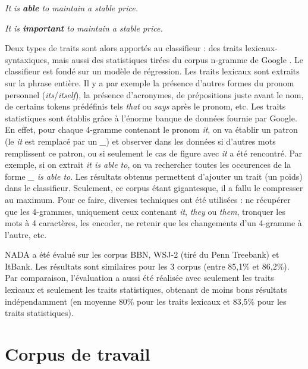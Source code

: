 \documentclass[a4paper,12pt]{article}
\begin{document}
\og{} \textit{It is \textbf{able} to maintain a stable price.} \fg{}

\og{} \textit{It is \textbf{important} to maintain a stable price.} \fg{}

Deux types de traits sont alors apportés au classifieur : des traits lexicaux-syntaxiques, mais aussi des statistiques tirées du corpus n-gramme de Google \citep{google-ngram}. Le classifieur est fondé sur un modèle de régression. Les traits lexicaux sont extraits sur la phrase entière. Il y a par exemple la présence d'autres formes du pronom personnel (\textit{its}/\textit{itself}), la présence d'acronymes, de prépositions juste avant le nom, de certains tokens prédéfinis tels \og{}\textit{that}\fg{} ou \og{}\textit{says}\fg{} après le pronom, etc.
Les traits statistiques sont établis grâce à l'énorme banque de données fournie par Google. En effet, pour chaque 4-gramme contenant le pronom \og{}\textit{it}\fg{}, on va établir un patron (le \og{}\textit{it}\fg{} est remplacé par un \og{}\textit{\_}\fg{}) et observer dans les données si d'autres mots remplissent ce patron, ou si seulement le cas de figure avec \og{}\textit{it}\fg{} a été rencontré. Par exemple, si on extrait \og{}\textit{it is able to}\fg{}, on va rechercher toutes les occurences de la forme \og{}\textit{\_ is able to}\fg{}.
Les résultats obtenus permettent d'ajouter un trait (un poids) dans le classifieur.
Seulement, ce corpus étant gigantesque, il a fallu le compresser au maximum. Pour ce faire, diverses techniques ont été utilisées : ne récupérer que les 4-grammes, uniquement ceux contenant \og{}\textit{it}\fg{}, \og{}\textit{they}\fg{} ou \og{}\textit{them}\fg{}, tronquer les mots à 4 caractères, les encoder, ne retenir que les changements d'un 4-gramme à l'autre, etc.

NADA a été évalué sur les corpus BBN\cite{BBN}, WSJ-2 (tiré du Penn Treebank\cite{Marcus-1993-BLA-972470.972475}) et ItBank\cite{Bergsma08distributionalidentification}. Les résultats sont similaires pour les 3 corpus (entre 85,1\% et 86,2\%). Par comparaison, l'évaluation a aussi été réalisée avec seulement les traits lexicaux et seulement les traits statistiques, obtenant de moins bons résultats indépendamment (en moyenne 80\% pour les traits lexicaux et 83,5\% pour les traits statistiques).


\section{Corpus de travail}
\label{corpus}
\end{document}
